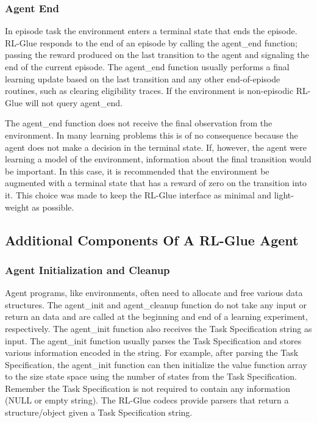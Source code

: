 \documentclass[11pt]{article}
\begin{document}
\subsubsection{Agent End}
In episode task the environment enters a terminal state that ends the episode. RL-Glue responds to the end of an episode by calling the agent\_end function; passing the reward produced on the last transition to the agent and signaling the end of the current episode. The agent\_end function usually performs a final learning update based on the last transition and any other end-of-episode routines, such as clearing eligibility traces. If the environment is non-episodic RL-Glue will not query agent\_end.

The agent\_end function does not receive the final observation from the environment. In many learning problems this is of no consequence because the agent does not make a decision in the terminal state. If, however, the agent were learning a model of the environment, information about the final transition would be important. In this case, it is recommended that the environment be augmented with a terminal state that has a reward of zero on the transition into it. This choice was made to keep the RL-Glue interface as minimal and light-weight as possible. 

\subsection{Additional Components Of A RL-Glue Agent}
\label{agentp2}

\subsubsection{Agent Initialization and Cleanup}
Agent programs, like environments, often need to allocate and free various data structures. The agent\_init and agent\_cleanup function do not take any input or return an data and are called at the beginning and end of a learning experiment, respectively. The agent\_init function also receives the Task Specification string as input. The agent\_init function usually parses the Task Specification and stores various information encoded in the string. For example, after parsing the Task Specification, the agent\_init function can then initialize the value function array to the size state space using the number of states from the Task Specification. Remember the Task Specification is not required to contain any information (NULL or empty string). The RL-Glue codecs provide parsers that return a structure/object given a Task Specification string.     
\end{document}
